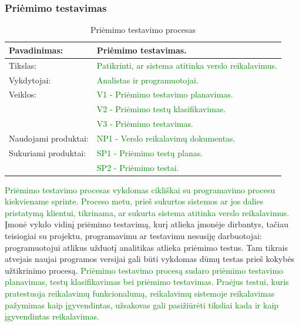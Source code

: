 \documentclass{VUMIFPSkursinis}
\begin{document}
	\subsubsection{Priėmimo testavimas}
	\begin{center}
		\begin{table}[ht]
			\caption{Priėmimo testavimo procesas}
			\begin{tabular}{ | l | l | }
				\hline
				Pavadinimas:         & Priėmimo testavimas.                                               \\ \hline
				Tikslas:             & \textcolor{green}{Patikrinti, ar sistema atitinka verslo reikalavimus.}   \\ \hline
				Vykdytojai:          & \textcolor{green}{Analistas ir programuotojai.}                           \\ \hline
				Veiklos:             & \textcolor{green}{V1 - Priėmimo testavimo planavimas.}                    \\
				                     & \textcolor{green}{V2 - Priėmimo testų klasifikavimas.}             \\
				                     & \textcolor{green}{V3 - Priėmimo testavimas.}                              \\ \hline
				Naudojami produktai: & \textcolor{green}{NP1 - Verslo reikalavimų dokumentas.}                   \\ \hline
				Sukuriami produktai: & \textcolor{green}{SP1 - Priėmimo testų planas.}                    \\
				                     & \textcolor{green}{SP2 - Priėmimo testai.}                          \\ \hline
			\end{tabular}
		\end{table}
	\end{center}
	\textcolor{green}{Priėmimo testavimo procesas vykdomas cikliškai su programavimo procesu kiekviename sprinte.
	Proceso metu, prieš sukurtos sistemos ar jos dalies pristatymą klientui, tikrinama, ar sukurta sistema atitinka verslo reikalavimus.}
	Įmonė vykdo vidinį priėmimo testavimą, kurį atlieka įmonėje dirbantys, tačiau teisiogiai su projektu, programavimu ar testavimu nesusiję darbuotojai: programuotojui atlikus užduotį analitikas atlieka priėmimo testus.
	Tam tikrais atvejais naujai programos versijai gali būti vykdomas dūmų testas prieš kokybės užtikrinimo procesą.
	\textcolor{green}{Priėmimo testavimo procesą sudaro priėmimo testavimo planavimas, testų klasifikavimas bei priėmimo testavimas.
	Praėjus testui, kuris pratestuoja reikalavimų funkcionalumą, reikalavimų sistemoje reikalavimas pažymimas kaip įgyvendintas, užsakovas gali pasižiūrėti tiksliai kada ir kaip įgyvendintas reikalavimas.}
\end{document}
